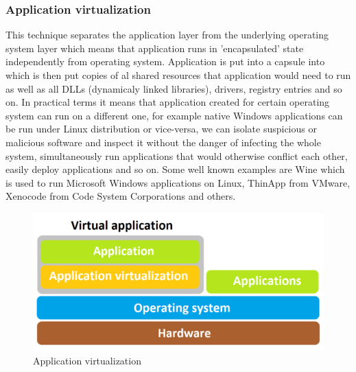 \begin{enumerate}
\subsubsection{Application virtualization}
This technique separates the application layer from the underlying operating system layer which means that application runs in 'encapsulated' state independently from operating system. Application is put into a capsule into which is then put copies of al shared resources that application would need to run as well as all DLLs (dynamicaly linked libraries), drivers, registry entries and so on. In practical terms it means that application created for certain operating system can run on a different one, for example native Windows applications can be run under Linux distribution or vice-versa, we can isolate suspicious or malicious software and inspect it without the danger of infecting the whole system, simultaneously run applications that would otherwise conflict each other, easily deploy applications and so on. Some well known examples are Wine which is used to run Microsoft Windows applications on Linux, ThinApp from VMware, Xenocode from Code System Corporations and others.

\begin{figure}[H]
\centering
\includegraphics[scale=0.45]{app-virt.png}
\caption{Application virtualization}
\end{figure}



\end{enumerate}
